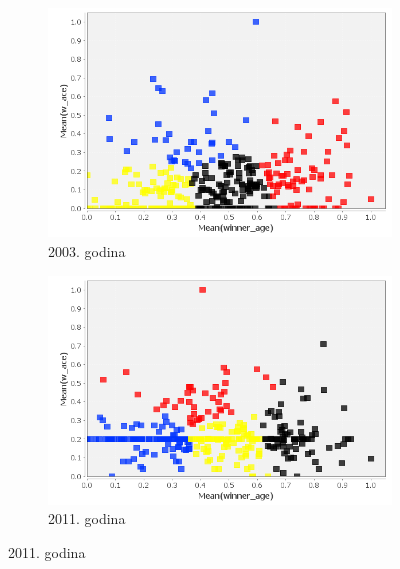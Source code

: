 \documentclass[a4paper]{article}
\begin{document}
\begin{figure}[H]
	\begin{subfigure}[h]{\textwidth}
		\begin{center}
			\includegraphics[scale=0.40]{Klasterovanje/ScatterPlot_KMeans2003.png}
		\end{center}
		\caption{2003. godina}
		\label{fig:KNIME_ScatterPlot2003}
	\end{subfigure}
	
	\vspace{0.5cm}
	\begin{subfigure}[h]{\textwidth}
		\begin{center}
			\includegraphics[scale=0.40]{Klasterovanje/ScatterPlot_KMeans2011.png}
		\end{center}
		\caption{2011. godina}
		\label{KNIME_ScatterPlot2011}
	\end{subfigure}
	

\end{figure}
\end{document}
